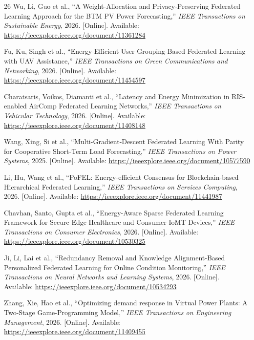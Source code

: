 \documentclass[journal]{IEEEtran}
\begin{document}
\begin{thebibliography}{26}
Wu, Li, Guo et al., ``A Weight-Allocation and Privacy-Preserving Federated Learning Approach for the BTM PV Power Forecasting,'' \textit{IEEE Transactions on Sustainable Energy}, 2026. [Online]. Available: \url{https://ieeexplore.ieee.org/document/11361284}

Fu, Ku, Singh et al., ``Energy-Efficient User Grouping-Based Federated Learning with UAV Assistance,'' \textit{IEEE Transactions on Green Communications and Networking}, 2026. [Online]. Available: \url{https://ieeexplore.ieee.org/document/11454597}

Charatsaris, Voikos, Diamanti et al., ``Latency and Energy Minimization in RIS-enabled AirComp Federated Learning Networks,'' \textit{IEEE Transactions on Vehicular Technology}, 2026. [Online]. Available: \url{https://ieeexplore.ieee.org/document/11408148}

Wang, Xing, Si et al., ``Multi-Gradient-Descent Federated Learning With Parity for Cooperative Short-Term Load Forecasting,'' \textit{IEEE Transactions on Power Systems}, 2025. [Online]. Available: \url{https://ieeexplore.ieee.org/document/10577590}

Li, Hu, Wang et al., ``PoFEL: Energy-efficient Consensus for Blockchain-based Hierarchical Federated Learning,'' \textit{IEEE Transactions on Services Computing}, 2026. [Online]. Available: \url{https://ieeexplore.ieee.org/document/11441987}

Chavhan, Santo, Gupta et al., ``Energy-Aware Sparse Federated Learning Framework for Secure Edge Healthcare and Consumer IoMT Devices,'' \textit{IEEE Transactions on Consumer Electronics}, 2026. [Online]. Available: \url{https://ieeexplore.ieee.org/document/10530325}

Ji, Li, Lai et al., ``Redundancy Removal and Knowledge Alignment-Based Personalized Federated Learning for Online Condition Monitoring,'' \textit{IEEE Transactions on Neural Networks and Learning Systems}, 2026. [Online]. Available: \url{https://ieeexplore.ieee.org/document/10534293}

Zhang, Xie, Hao et al., ``Optimizing demand response in Virtual Power Plants: A Two-Stage Game-Programming Model,'' \textit{IEEE Transactions on Engineering Management}, 2026. [Online]. Available: \url{https://ieeexplore.ieee.org/document/11409455}


\end{thebibliography}
\end{document}
